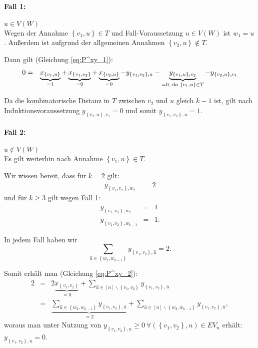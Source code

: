 \documentclass[10p,a4paper,BCOR = 12mm, DIV=15]{scrbook}
\begin{document}
\begin{bew}
\paragraph{Fall 1:} $u\in V\left(W\right)$ \\

Wegen der Annahme $\left\{v_1, u\right\} \in T$ und Fall-Voraussetzung $u\in V\left(W\right)$ ist $w_1 = u$. Außerdem ist aufgrund der allgemeinen Annahmen $\left\{v_2, u\right\} \notin T$.

Dann gilt (Gleichung \eqref{eq:P^xy_1}):
\begin{eqnarray*}
0 & = & \underbrace{x_{\left\{v_1, u\right\}}}_{= 1} + \underbrace{x_{\left\{v_1, v_2\right\}}}_{= 0} + \underbrace{x_{\left\{v_2, u\right\}}}_{= 0} - y_{\left\{v_1, v_2\right\}, u} - \underbrace{y_{\left\{v_1, u\right\}, v_2}}_{= 0\textnormal{, da }\left\{v_1, u\right\}\in T} - y_{\left\{v_2, u\right\}, v_1}
\end{eqnarray*}

Da die kombinatorische Distanz in $T$ zwischen $v_2$ und $u$ gleich $k-1$ ist, gilt nach Induktionsvoraussetzung $y_{\left\{v_2, u\right\}, v_1} = 0$ und somit $y_{\left\{v_1, v_2\right\}, u} = 1$.

\paragraph{Fall 2:} $u\notin V\left(W\right)$ \\

Es gilt weiterhin nach Annahme $\left\{v_1, u\right\} \in T$.

Wir wissen bereit, dass für $k=2$ gilt:
\begin{eqnarray*}
y_{\left\{v_1, v_2\right\}, w_2} & = & 2
\end{eqnarray*}
und für $k\geq 3$ gilt wegen Fall 1:
\begin{eqnarray*}
y_{\left\{v_1, v_2\right\}, w_2} & = & 1 \\
y_{\left\{v_1, v_2\right\}, w_{k-1}} & = & 1.
\end{eqnarray*}

In jedem Fall haben wir
\begin{displaymath}
\sum_{\widehat{u}\in \left\{w_2, w_{k-1}\right\}} y_{\left\{v_1, v_2\right\}, \widehat{u}} = 2.
\end{displaymath}

Somit erhält man (Gleichung \eqref{eq:P^xy_2}):
\begin{eqnarray*}
2 & = & 2 \underbrace{x_{\left\{v_1, v_2\right\}}}_{= 0} + 
\sum_{\widehat{u}\in[n]\backslash\left\{v_1, v_2\right\}} y_{\left\{v_1, v_2\right\}, \widehat{u}} \\
& = & \underbrace{\sum_{\widehat{u}\in \left\{w_2, w_{k-1}\right\}} y_{\left\{v_1, v_2\right\}, \widehat{u}}}_{ = 2} + \sum_{\widehat{u}\in \left[n\right] \backslash \left\{w_2, w_{k-1}\right\}} y_{\left\{v_1, v_2\right\}, \widehat{u}},
\end{eqnarray*}
woraus man unter Nutzung von $y_{\left\{v_1, v_2\right\}, u} \geq 0 \ \forall \left(\left\{v_1, v_2\right\}, u\right) \in EV_n$ erhält: $y_{\left\{v_1, v_2\right\}, u} = 0$.
\end{bew}
\end{document}
